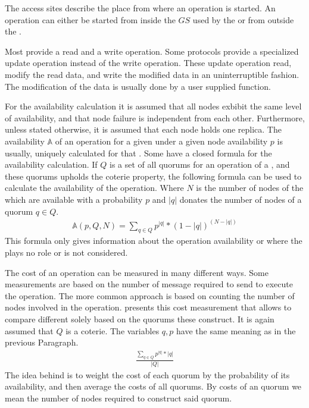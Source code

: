 \documentclass[conference]{IEEEtran}
\begin{document}
The access sites describe the place from where an operation is started.
An operation can either be started from inside the \(GS\) used by the 
or from outside the .

Most  provide a read and a write operation.
Some protocols provide a specialized update operation instead of the write
operation.
These update operation read, modify the read data, and write the modified data
in an uninterruptible fashion.
The modification of the data is usually done by a user supplied function. 

For the availability calculation it is assumed that all nodes exbibit the same
level of availability, and that node failure is independent from each other.
Furthermore, unless stated otherwise, it is assumed that each node holds one
replica.
The availability \(\mathbb{A}\) of an operation for a given  under a given
node availability \(p\) is usually, uniquely calculated for that .
Some  have a closed formula for the availability calculation.
If \(Q\) is a set of all quorums for an operation of a , and these
quorums upholds the coterie property, the following formula can be used to
calculate the availability of the operation.
Where \(N\) is the number of nodes of the  which are available with a
probability \(p\) and \(|q|\) donates the number of nodes of a quorum \(q \in
Q\).
\begin{align}
	\mathbb{A}(p,Q,N) = \sum_{q \in Q} p^{|q|} * (1-|q|)^{(N-|q|)} \label{eq:avail}
\end{align}
This formula only gives information about the operation availability or 
where the  plays no role or is not considered.

The cost of an operation can be measured in many different ways.
Some measurements are based on the number of message required to send to
execute the operation.
The more common approach is based on counting the number of nodes involved in
the operation.
 presents this cost measurement that allows to compare different
 solely based on the quorums these  construct.
It is again assumed that \(Q\) is a coterie.
The variables \(q,p\) have the same meaning as in the previous Paragraph.
\begin{align}
	\frac{\sum_{q \in Q} p^{|q|} * |q|}{|Q|} \label{eq:cost}
\end{align}
The idea behind  is to weight the cost of each quorum by the
probability of its availability, and then average the costs of all quorums.
By costs of an quorum we mean the number of nodes required to construct said
quorum.
\end{document}
